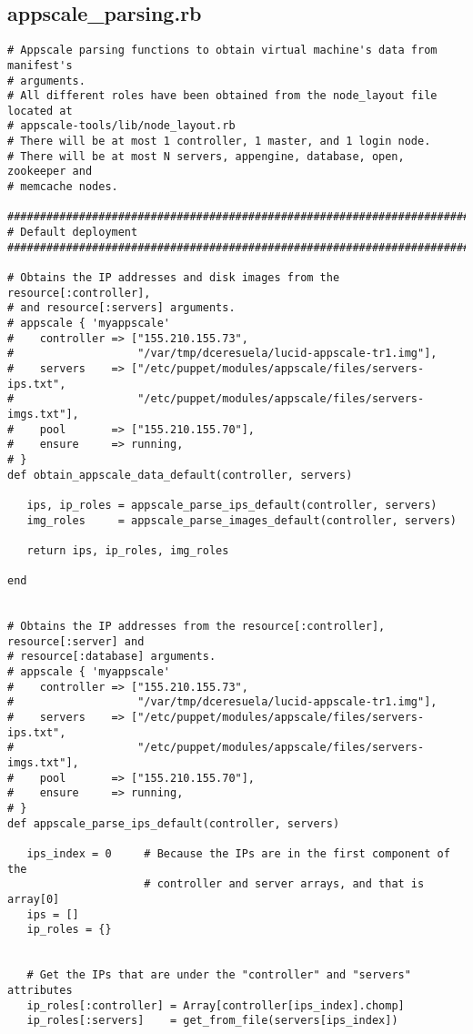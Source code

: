 \subsection{appscale\_parsing.rb}


\begin{lstlisting}
# Appscale parsing functions to obtain virtual machine's data from manifest's
# arguments.
# All different roles have been obtained from the node_layout file located at
# appscale-tools/lib/node_layout.rb
# There will be at most 1 controller, 1 master, and 1 login node.
# There will be at most N servers, appengine, database, open, zookeeper and
# memcache nodes.

################################################################################
# Default deployment
################################################################################

# Obtains the IP addresses and disk images from the resource[:controller],
# and resource[:servers] arguments.
# appscale { 'myappscale'
#    controller => ["155.210.155.73",
#                   "/var/tmp/dceresuela/lucid-appscale-tr1.img"],
#    servers    => ["/etc/puppet/modules/appscale/files/servers-ips.txt",
#                   "/etc/puppet/modules/appscale/files/servers-imgs.txt"],
#    pool       => ["155.210.155.70"],
#    ensure     => running,
# }
def obtain_appscale_data_default(controller, servers)

   ips, ip_roles = appscale_parse_ips_default(controller, servers)
   img_roles     = appscale_parse_images_default(controller, servers)
   
   return ips, ip_roles, img_roles

end


# Obtains the IP addresses from the resource[:controller], resource[:server] and
# resource[:database] arguments.
# appscale { 'myappscale'
#    controller => ["155.210.155.73",
#                   "/var/tmp/dceresuela/lucid-appscale-tr1.img"],
#    servers    => ["/etc/puppet/modules/appscale/files/servers-ips.txt",
#                   "/etc/puppet/modules/appscale/files/servers-imgs.txt"],
#    pool       => ["155.210.155.70"],
#    ensure     => running,
# }
def appscale_parse_ips_default(controller, servers)

   ips_index = 0     # Because the IPs are in the first component of the
                     # controller and server arrays, and that is array[0]
   ips = []
   ip_roles = {}

   
   # Get the IPs that are under the "controller" and "servers" attributes
   ip_roles[:controller] = Array[controller[ips_index].chomp]
   ip_roles[:servers]    = get_from_file(servers[ips_index])
   

\end{lstlisting}

